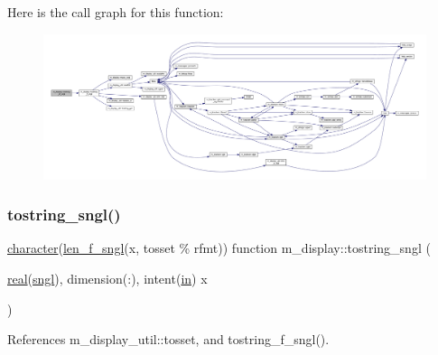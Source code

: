 Here is the call graph for this function\+:
\nopagebreak
\begin{figure}[H]
\begin{center}
\leavevmode
\includegraphics[width=350pt]{namespacem__display_a7767d9921f1509c55b3cae0cb7ba69b4_cgraph}
\end{center}
\end{figure}
\mbox{\label{namespacem__display_a369e3db088c0732554bd00dac6ce628d}} 
\subsubsection{\texorpdfstring{tostring\+\_\+sngl()}{tostring\_sngl()}}
{\footnotesize\ttfamily \hyperlink{option__stopwatch_83_8txt_abd4b21fbbd175834027b5224bfe97e66}{character}(\hyperlink{namespacem__display_ae0feb946fbc4c31f8ba53e20719fa508}{len\+\_\+f\+\_\+sngl}(x, tosset \% rfmt)) function m\+\_\+display\+::tostring\+\_\+sngl (\begin{DoxyParamCaption}\item[{\hyperlink{read__watch_83_8txt_abdb62bde002f38ef75f810d3a905a823}{real}(\hyperlink{namespacem__display_a2ac86bc535c3ccc5947dbb3109c666b5}{sngl}), dimension(\+:), intent(\hyperlink{M__journal_83_8txt_afce72651d1eed785a2132bee863b2f38}{in})}]{x }\end{DoxyParamCaption})\hspace{0.3cm}{\ttfamily [private]}}



References m\+\_\+display\+\_\+util\+::tosset, and tostring\+\_\+f\+\_\+sngl().

